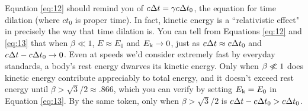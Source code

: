 \documentclass[12pt]{article}
\begin{document}
Equation \ref{eq:12} should remind you of $c \mkern.5mu \Delta t=\gamma c \mkern.5mu \Delta t_0$, the equation for time dilation (where $ct_0$ is proper time). In fact, kinetic energy is a ``relativistic effect" in precisely the way that time dilation is. You can tell from Equations \ref{eq:12} and \ref{eq:13} that when $\beta \ll 1$, $E \approx E_0$ and $E_{\mkern.5mu \textrm{k}} \rightarrow 0$, just as $c \mkern.5mu \Delta t \approx c \mkern.5mu \Delta t_0$ and $c \mkern.5mu \Delta t - c \mkern.5mu \Delta t_0 \rightarrow 0$. Even at speeds we'd consider extremely fast by everyday standards, a body's rest energy dwarves its kinetic energy. Only when $\beta \centernot{\ll} 1$ does kinetic energy contribute appreciably to total energy, and it doesn't exceed rest energy until $\beta > \sqrt{3}/2 \approx .866$, which you can verify by setting $E_{\mkern.5mu \textrm{k}}=E_0$ in Equation \ref{eq:13}. By the same token, only when $\beta > \sqrt{3}/2$ is $c \mkern.5mu \Delta t - c \mkern.5mu \Delta t_0 > c \mkern.5mu \Delta t_0$.
\end{document}
